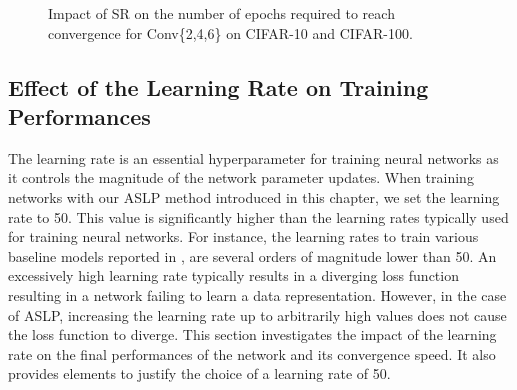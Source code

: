 \begin{figure}[htbp]
  \centering
  \caption{Impact of \acf{SR} on the number of epochs required to reach
    convergence for Conv\{2,4,6\} on CIFAR-10 and CIFAR-100.}
  \label{fig:chap2:rescale_impact}
\end{figure}

\subsection{Effect of the Learning Rate on Training Performances}
\label{sec:chap2:impact_learning_rate}

The learning rate is an essential hyperparameter for training neural networks as
it controls the magnitude of the network parameter updates. When training
networks with our \ac{ASLP} method introduced in this chapter, we set the
learning rate to 50. This value is significantly higher than the learning rates
typically used for training neural networks. For instance, the learning rates to
train various baseline models reported in \cite{nvidia-baselines}, are several
orders of magnitude lower than 50. An excessively high learning rate typically
results in a diverging loss function resulting in a network failing to learn a
data representation. However, in the case of \ac{ASLP}, increasing the learning
rate up to arbitrarily high values does not cause the loss function to diverge.
This section investigates the impact of the learning rate on the final
performances of the network and its convergence speed. It also provides elements
to justify the choice of a learning rate of 50.\\

